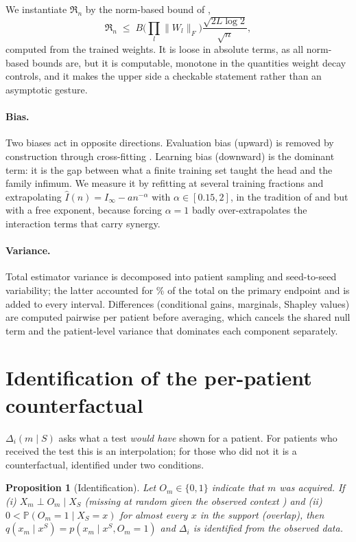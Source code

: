 \documentclass[11pt]{article}
\newtheorem{proposition}{Proposition}
\theoremstyle{definition}
\theoremstyle{remark}
\newcommand{\Prob}{\mathbb{P}}
\begin{document}
We instantiate $\mathfrak R_n$ by the norm-based bound of
\citet{golowich2018size},
\[
  \mathfrak R_n \;\le\; B\Big(\prod_{l}\|W_l\|_F\Big)
  \frac{\sqrt{2L\log 2}}{\sqrt n},
\]
computed from the trained weights. It is loose in
absolute terms, as all norm-based bounds are, but it is computable, monotone in
the quantities weight decay controls, and it makes the upper side a checkable
statement rather than an asymptotic gesture.

\paragraph{Bias.} Two biases act in opposite directions. Evaluation bias
(upward) is removed by construction through cross-fitting
\citep{chernozhukov2018dml}. Learning bias (downward) is the dominant term: it
is the gap between what a finite training set taught the head and the family
infimum. We measure it by refitting at several training fractions and
extrapolating $\hat I(n)=I_\infty-a n^{-\alpha}$ with $\alpha\in[0.15,2]$, in the
tradition of \citet{strong1998entropy} and \citet{panzeri2007correcting} but with
a free exponent, because forcing $\alpha=1$ badly over-extrapolates the
interaction terms that carry synergy.

\paragraph{Variance.} Total estimator variance is decomposed into patient
sampling and seed-to-seed variability; the latter accounted for
\primarySeedShare\% of the total on the primary endpoint and is added to every
interval. Differences (conditional gains, marginals, Shapley values) are computed
pairwise per patient before averaging, which cancels the shared null term and the
patient-level variance that dominates each component separately.

\section{Identification of the per-patient counterfactual}
\label{sec:s-ident}
\label{sec:ident}

$\Delta_i(m\mid S)$ asks what a test \emph{would have} shown for a patient. For
patients who received the test this is an interpolation; for those who did not it
is a counterfactual, identified under two conditions.

\begin{proposition}[Identification]
Let $O_m\in\{0,1\}$ indicate that $m$ was acquired. If
(i) $X_m \perp O_m \mid X_S$ (missing at random given the observed context
\citep{rubin1976inference}) and
(ii) $0<\Prob(O_m=1\mid X_S=x)$ for almost every $x$ in the support (overlap),
then $q(x_m\mid x^S)=p(x_m\mid x^S,O_m=1)$ and $\Delta_i$ is identified from the
observed data.
\end{proposition}
\end{document}

